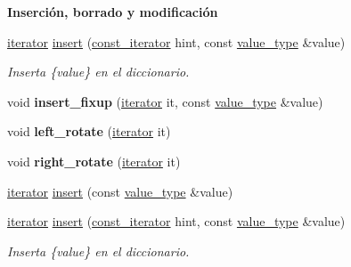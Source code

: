 \begin{Indent}\textbf{ Inserción, borrado y modificación}\par
\begin{DoxyCompactItemize}
\item 
\hyperlink{classaed2_1_1map_1_1iterator}{iterator} \hyperlink{classaed2_1_1map_a6941cde9a79c27f054b5c97a587a1854}{insert} (\hyperlink{classaed2_1_1map_1_1const__iterator}{const\+\_\+iterator} hint, const \hyperlink{classaed2_1_1map_a719db98e0ff9a837610f76be33264680}{value\+\_\+type} \&value)
\begin{DoxyCompactList}\small\item\em Inserta \{value\} en el diccionario. \end{DoxyCompactList}\item 
\mbox{\label{classaed2_1_1map_a71e3ecf911958188e1e2fd7d76b2b1e9}} 
void {\bfseries insert\+\_\+fixup} (\hyperlink{classaed2_1_1map_1_1iterator}{iterator} it, const \hyperlink{classaed2_1_1map_a719db98e0ff9a837610f76be33264680}{value\+\_\+type} \&value)
\item 
\mbox{\label{classaed2_1_1map_a1f4b383ece3e22680802d27aa11b623a}} 
void {\bfseries left\+\_\+rotate} (\hyperlink{classaed2_1_1map_1_1iterator}{iterator} it)
\item 
\mbox{\label{classaed2_1_1map_af339eb8e0af78bc07ad55ddd97938ee7}} 
void {\bfseries right\+\_\+rotate} (\hyperlink{classaed2_1_1map_1_1iterator}{iterator} it)
\item 
\hyperlink{classaed2_1_1map_1_1iterator}{iterator} \hyperlink{classaed2_1_1map_a60aacba06b1579630b3c8e996cf248c8}{insert} (const \hyperlink{classaed2_1_1map_a719db98e0ff9a837610f76be33264680}{value\+\_\+type} \&value)
\item 
\hyperlink{classaed2_1_1map_1_1iterator}{iterator} \hyperlink{classaed2_1_1map_a6941cde9a79c27f054b5c97a587a1854}{insert} (\hyperlink{classaed2_1_1map_1_1const__iterator}{const\+\_\+iterator} hint, const \hyperlink{classaed2_1_1map_a719db98e0ff9a837610f76be33264680}{value\+\_\+type} \&value)
\begin{DoxyCompactList}\small\item\em Inserta \{value\} en el diccionario. \end{DoxyCompactList}\item 
\mbox{\label{classaed2_1_1map_a905aa80287bf2a97cca5a9dda1c8ab12}} 

\end{DoxyCompactItemize}
\end{Indent}
